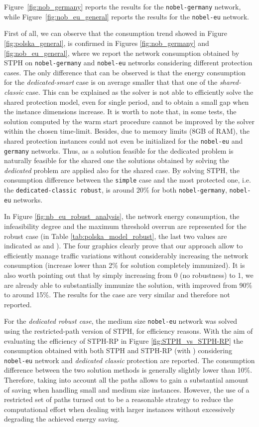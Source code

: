 \documentclass[final,5p,times,twocolumn]{elsarticle}
\begin{document}
Figure~\ref{fig:nob_germany} reports the results for the {\tt nobel-germany} network, while Figure~\ref{fig:nob_eu_general} reports the results for the {\tt nobel-eu} network.

First of all, we can observe that the consumption trend showed in Figure \ref{fig:polska_general}, is confirmed in Figures \ref{fig:nob_germany} and \ref{fig:nob_eu_general}, where we report the network consumption obtained by STPH on {\tt nobel-germany} and {\tt nobel-eu} networks considering different protection cases. The only difference that can be observed is that the energy consumption for the \textit{dedicated-smart} case is on average smaller that that one of the \textit{shared-classic} case. This can be explained as the solver is not able to efficiently solve the shared protection model, even for single period, and to obtain a small gap  when the instance dimensions increase. It is worth to note that, in some tests, the solution computed by the warm start procedure cannot be improved by the solver within the chosen time-limit. Besides, due to memory limits (8GB of RAM), the shared protection instances could not even be initialized for the  {\tt nobel-eu} and {\tt germany} networks. Thus,  as a solution feasible for the dedicated problem is naturally feasible for the shared one the solutions obtained by solving the \textit{dedicated} problem are applied also for the shared case. By solving STPH, the consumption difference between the {\tt simple} case and  the most protected one, i.e. the {\tt dedicated-classic robust}, is around 20\% for both {\tt nobel-germany}, {\tt nobel-eu} networks.

In Figure \ref{fig:nb_eu_robust_analysis},  the network energy consumption, the infeasibility degree and the maximum threshold overrun  are represented  for the robust case (in Table \ref{tab:polska_model_robust}, the last two values are indicated as  and  ). The four graphics clearly prove that our approach allow to efficiently manage traffic variations without considerably increasing the network consumption (increase lower than 2\% for solution completely immunized). It is also worth pointing out that by simply increasing  from 0 (no robustness) to 1, we are already able to substantially immunize the solution, with  improved from 90\% to around 15\%. The results for the  case are very similar and therefore not reported.

For the \textit{dedicated robust case}, the medium size {\tt nobel-eu} network was solved using the restricted-path version of STPH, for efficiency reasons. With the aim of evaluating the efficiency of STPH-RP  in Figure \ref{fig:STPH_vs_STPH-RP} the consumption obtained with both STPH and STPH-RP (with ) considering {\tt nobel-eu} network and \textit{dedicated classic} protection are reported. The consumption difference between the two solution methods is generally slightly lower than 10\%. Therefore, taking into account all the paths allows to gain a substantial amount of saving when handling small and medium size instances. However, the use of a restricted set of paths turned out to be a reasonable strategy to reduce the computational effort when dealing with larger instances without excessively degrading the achieved energy saving.
\end{document}

